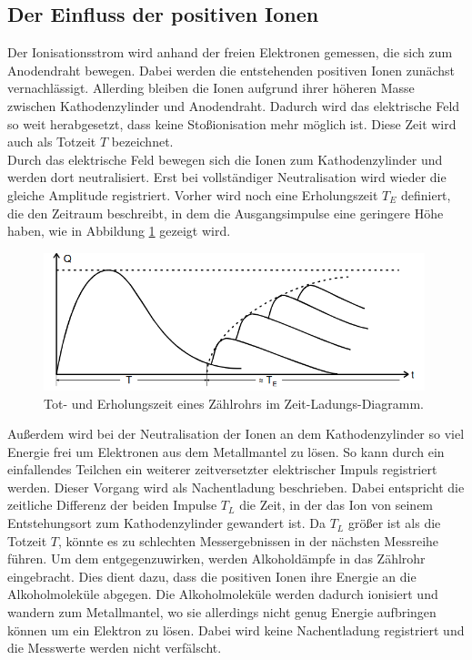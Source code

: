 \subsection{Der Einfluss der positiven Ionen}
Der Ionisationsstrom wird anhand der freien Elektronen gemessen, die sich zum Anodendraht bewegen.
Dabei werden die entstehenden positiven Ionen zunächst vernachlässigt.
Allerding bleiben die Ionen aufgrund ihrer höheren Masse zwischen Kathodenzylinder und Anodendraht.
Dadurch wird das elektrische Feld so weit herabgesetzt, dass keine Sto\ss{}ionisation mehr möglich ist.
Diese Zeit wird auch als Totzeit $T$ bezeichnet.\\
Durch das elektrische Feld bewegen sich die Ionen zum Kathodenzylinder und werden dort neutralisiert.
Erst bei vollständiger Neutralisation wird wieder die gleiche Amplitude registriert.
Vorher wird noch eine Erholungszeit $T_E$ definiert, die den Zeitraum beschreibt, in dem die Ausgangsimpulse eine geringere Höhe haben, wie in Abbildung \ref{fig:Ionen} gezeigt wird.
 
\begin{figure}[h]
    \centering
    \includegraphics[height=4cm]{Theorie/Ionen.png}
    \caption{Tot- und Erholungszeit eines Zählrohrs im Zeit-Ladungs-Diagramm.}
    \label{fig:Ionen}
\end{figure}

Außerdem wird bei der Neutralisation der Ionen an dem Kathodenzylinder so viel Energie frei um Elektronen aus dem Metallmantel zu lösen.
So kann durch ein einfallendes Teilchen ein weiterer zeitversetzter elektrischer Impuls registriert werden.
Dieser Vorgang wird als Nachentladung beschrieben.
Dabei entspricht die zeitliche Differenz der beiden Impulse $T_L$ die Zeit, in der das Ion von seinem Entstehungsort zum Kathodenzylinder gewandert ist.
Da $T_L$ größer ist als die Totzeit $T$, könnte es zu schlechten Messergebnissen in der nächsten Messreihe führen.
Um dem entgegenzuwirken, werden Alkoholdämpfe in das Zählrohr eingebracht.
Dies dient dazu, dass die positiven Ionen ihre Energie an die Alkoholmoleküle abgegen.
Die Alkoholmoleküle werden dadurch ionisiert und wandern zum Metallmantel, wo sie allerdings nicht genug Energie aufbringen können um ein Elektron zu lösen.
Dabei wird keine Nachentladung registriert und die Messwerte werden nicht verfälscht.

